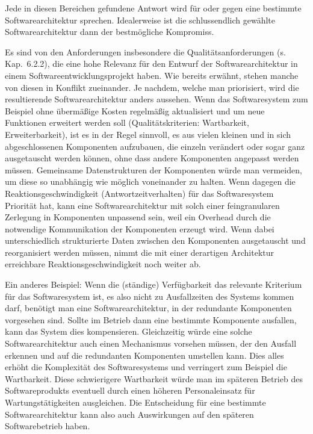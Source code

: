Jede in diesen Bereichen gefundene Antwort wird für oder gegen eine bestimmte Softwarearchitektur sprechen. Idealerweise ist die schlussendlich gewählte Softwarearchitektur dann der bestmögliche Kompromiss.

\vspace{\baselineskip} %

Es sind von den Anforderungen insbesondere die Qualitätsanforderungen 
\linebreak %
(s. Kap.~6.2.2), %
die eine hohe Relevanz für den Entwurf der Softwarearchitektur in einem Softwareentwicklungsprojekt haben. Wie bereits erwähnt, stehen manche von diesen in Konflikt zueinander. Je nachdem, welche man priorisiert, wird die resultierende Softwarearchitektur anders aussehen.  Wenn das Softwaresystem zum Beispiel ohne übermäßige Kosten regelmäßig aktualisiert und um neue Funktionen erweitert werden soll (Qualitätskriterien: Wartbarkeit, Erweiterbarkeit), ist es in der Regel sinnvoll, es aus vielen kleinen und in sich abgeschlossenen Komponenten aufzu\-bauen, die einzeln verändert oder sogar ganz ausgetauscht werden können, ohne dass andere Komponenten angepasst werden müssen. Gemeinsame Daten\-strukturen der Komponenten würde man vermeiden, um diese so unabhängig wie möglich voneinander zu halten. Wenn dagegen die Reaktionsgeschwindigkeit (Antwortzeitverhalten) für das Softwaresystem Priorität hat, kann eine Soft\-ware\-ar\-chi\-tek\-tur mit solch einer feingranularen Zerlegung in Komponenten unpassend sein, weil ein Overhead durch die notwendige Kommunikation der Komponenten erzeugt wird. Wenn dabei unterschiedlich strukturierte Daten zwischen den Komponenten ausgetauscht und reorganisiert werden müssen, nimmt die mit einer derartigen Architektur erreich\-bare Reaktionsgeschwindigkeit noch weiter ab. 

\vspace{2mm} %

Ein anderes Beispiel: Wenn die (ständige) Verfügbarkeit das relevante Kriterium für das Softwaresystem ist, es also nicht zu Ausfallzeiten des Systems kommen darf, benötigt man eine Softwarearchitektur, in der redundante Komponenten vorgesehen sind. Sollte im Betrieb dann eine bestimmte Komponente ausfallen, kann das System dies kompensieren. Gleichzeitig würde eine solche Softwarearchitektur auch einen Mechanismus vorsehen müssen, der den Ausfall erkennen und auf die redundanten Komponenten umstellen kann.  Dies alles erhöht die Komplexität des Software\-systems und verringert zum Beispiel die Wartbarkeit. Diese schwierigere Wartbarkeit würde man im späteren Betrieb des Softwareprodukts eventuell durch einen höheren Personaleinsatz für Wartungstätigkeiten ausgleichen. Die Entscheidung für eine bestimmte Softwarearchitektur kann also auch Auswirkungen auf den späteren Softwarebetrieb haben.

